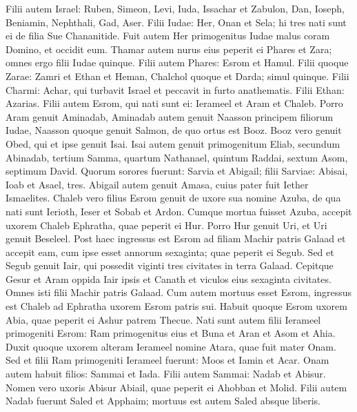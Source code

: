 \begin{biblechapter}
\begin{biblechapter}
\verse Filii autem Israel: Ruben, Simeon, Levi, Iuda, Issachar et Zabulon, 
\verse Dan, Ioseph, Beniamin, Nephthali, Gad, Aser.
 \verse Filii Iudae: Her, Onan et Sela; hi tres nati sunt ei de filia Sue Chananitide. Fuit autem Her primogenitus Iudae malus coram Domino, et occidit eum. 
\verse Thamar autem nurus eius peperit ei Phares et Zara; omnes ergo filii Iudae quinque.
 \verse Filii autem Phares: Esrom et Hamul.
 \verse Filii quoque Zarae: Zamri et Ethan et Heman, Chalchol quoque et Darda; simul quinque. 
\verse Filii Charmi: Achar, qui turbavit Israel et peccavit in furto anathematis. 
\verse Filii Ethan: Azarias.
 \verse Filii autem Esrom, qui nati sunt ei: Ierameel et Aram et Chaleb.
 \verse Porro Aram genuit Aminadab, Aminadab autem genuit Naasson principem filiorum Iudae, 
\verse Naasson quoque genuit Salmon, de quo ortus est Booz. 
\verse Booz vero genuit Obed, qui et ipse genuit Isai. 
\verse Isai autem genuit primogenitum Eliab, secundum Abinadab, tertium Samma, 
\verse quartum Nathanael, quintum Raddai, 
\verse sextum Asom, septimum David. 
\verse Quorum sorores fuerunt: Sarvia et Abigail; filii Sarviae: Abisai, Ioab et Asael, tres. 
\verse Abigail autem genuit Amasa, cuius pater fuit Iether Ismaelites.
 \verse Chaleb vero filius Esrom genuit de uxore sua nomine Azuba, de qua nati sunt Ierioth, Ieser et Sobab et Ardon. 
\verse Cumque mortua fuisset Azuba, accepit uxorem Chaleb Ephratha, quae peperit ei Hur. 
\verse Porro Hur genuit Uri, et Uri genuit Beseleel. 
\verse Post haec ingressus est Esrom ad filiam Machir patris Galaad et accepit eam, cum ipse esset annorum sexaginta; quae peperit ei Segub. 
 \verse Sed et Segub genuit Iair, qui possedit viginti tres civitates in terra Galaad. 
\verse Cepitque Gesur et Aram oppida Iair ipsis et Canath et viculos eius sexaginta civitates. Omnes isti filii Machir patris Galaad. 
\verse Cum autem mortuus esset Esrom, ingressus est Chaleb ad Ephratha uxorem Esrom patris sui. Habuit quoque Esrom uxorem Abia, quae peperit ei Ashur patrem Thecue.
 \verse Nati sunt autem filii Ierameel primogeniti Esrom: Ram primogenitus eius et Buna et Aran et Asom et Ahia. 
\verse Duxit quoque uxorem alteram Ierameel nomine Atara, quae fuit mater Onam. 
\verse Sed et filii Ram primogeniti Ierameel fuerunt: Moos et Iamin et Acar. 
\verse Onam autem habuit filios: Sammai et Iada. Filii autem Sammai: Nadab et Abisur. 
\verse Nomen vero uxoris Abisur Abiail, quae peperit ei Ahobban et Molid. 
\verse Filii autem Nadab fuerunt Saled et Apphaim; mortuus est autem Saled absque liberis. 

\end{biblechapter}
\end{biblechapter}
